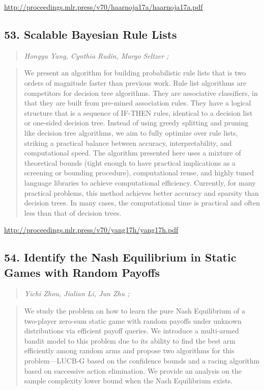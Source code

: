 \documentclass{article}
\begin{document}
\href{http://proceedings.mlr.press/v70/haarnoja17a/haarnoja17a.pdf}{http://proceedings.mlr.press/v70/haarnoja17a/haarnoja17a.pdf}

\subsection{53. Scalable Bayesian Rule Lists}

\begin{quote}
\footnotesize{\textit{Hongyu Yang, Cynthia Rudin, Margo Seltzer ;}}

\end{quote}

\begin{quote}
    We present an algorithm for building probabilistic rule lists that is two orders of magnitude faster than previous work. Rule list algorithms are competitors for decision tree algorithms. They are associative classifiers, in that they are built from pre-mined association rules. They have a logical structure that is a sequence of IF-THEN rules, identical to a decision list or one-sided decision tree. Instead of using greedy splitting and pruning like decision tree algorithms, we aim to fully optimize over rule lists, striking a practical balance between accuracy, interpretability, and computational speed. The algorithm presented here uses a mixture of theoretical bounds (tight enough to have practical implications as a screening or bounding procedure), computational reuse, and highly tuned language libraries to achieve computational efficiency. Currently, for many practical problems, this method achieves better accuracy and sparsity than decision trees. In many cases, the computational time is practical and often less than that of decision trees.  
\end{quote}

\href{http://proceedings.mlr.press/v70/yang17h/yang17h.pdf}{http://proceedings.mlr.press/v70/yang17h/yang17h.pdf}

\subsection{54. Identify the Nash Equilibrium in Static Games with Random Payoffs}

\begin{quote}
\footnotesize{\textit{Yichi Zhou, Jialian Li, Jun Zhu ;}}

\end{quote}

\begin{quote}
    We study the problem on how to learn the pure Nash Equilibrium of a two-player zero-sum static game with random payoffs under unknown distributions via efficient payoff queries. We introduce a multi-armed bandit model to this problem due to its ability to find the best arm efficiently among random arms and propose two algorithms for this problem—LUCB-G based on the confidence bounds and a racing algorithm based on successive action elimination. We provide an analysis on the sample complexity lower bound when the Nash Equilibrium exists.  
\end{quote}
\end{document}
